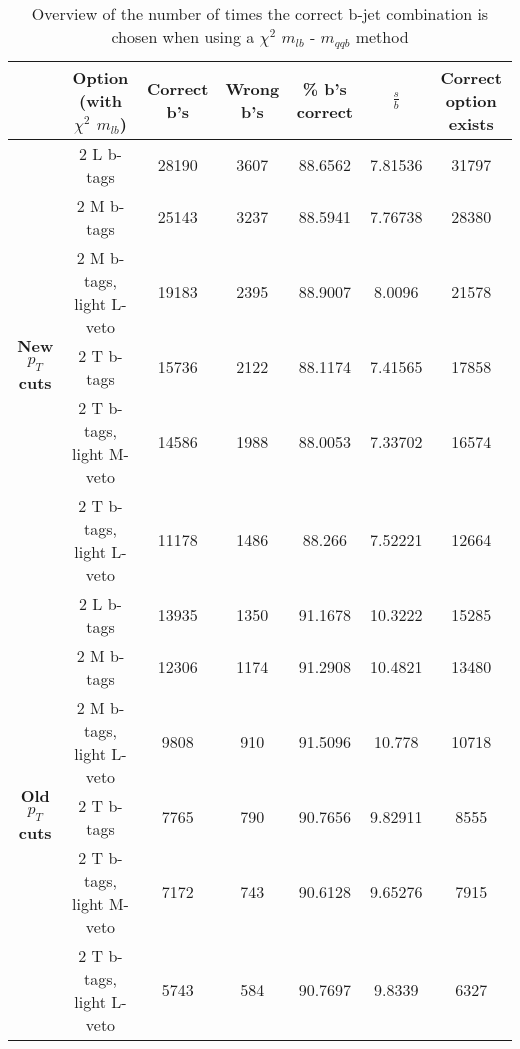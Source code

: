 \begin{landscape}
 \begin{table}[!h] 
 \begin{tabular}{c|c|c|c|c|c|c} 
& \textbf{Option} (with $\chi^{2}$ $m_{lb}$) & Correct b's & Wrong b's & \% b's correct   & $\frac{s}{b}$ & Correct option exists \\ \hline 
\multirow{6}{*}{\textbf{New $p_T$ cuts}}
& 2 L b-tags              & 28190 & 3607 & 88.6562 & 7.81536 & 31797 \\ 
& 2 M b-tags              & 25143 & 3237 & 88.5941 & 7.76738 & 28380 \\ 
& 2 M b-tags, light L-veto & 19183 & 2395 & 88.9007 & 8.0096 & 21578 \\ 
& 2 T b-tags              & 15736 & 2122 & 88.1174 & 7.41565 & 17858 \\ 
& 2 T b-tags, light M-veto & 14586 & 1988 & 88.0053 & 7.33702 & 16574 \\ 
& 2 T b-tags, light L-veto & 11178 & 1486 & 88.266 & 7.52221 & 12664 \\ 
\hline
\multirow{6}{*}{\textbf{Old $p_T$ cuts}} 
& 2 L b-tags              & 13935 & 1350 & 91.1678 & 10.3222 & 15285 \\ 
& 2 M b-tags              & 12306 & 1174 & 91.2908 & 10.4821 & 13480 \\ 
& 2 M b-tags, light L-veto & 9808 & 910 & 91.5096 & 10.778 & 10718 \\ 
& 2 T b-tags              & 7765 & 790 & 90.7656 & 9.82911 & 8555 \\ 
& 2 T b-tags, light M-veto & 7172 & 743 & 90.6128 & 9.65276 & 7915 \\ 
& 2 T b-tags, light L-veto & 5743 & 584 & 90.7697 & 9.8339 & 6327 \\ 
 \end{tabular} 
 \caption{Overview of the number of times the correct b-jet combination is chosen when using a $\chi^{2}$ $m_{lb}$ - $m_{qqb}$ method} 
 \end{table} 

\end{landscape}
